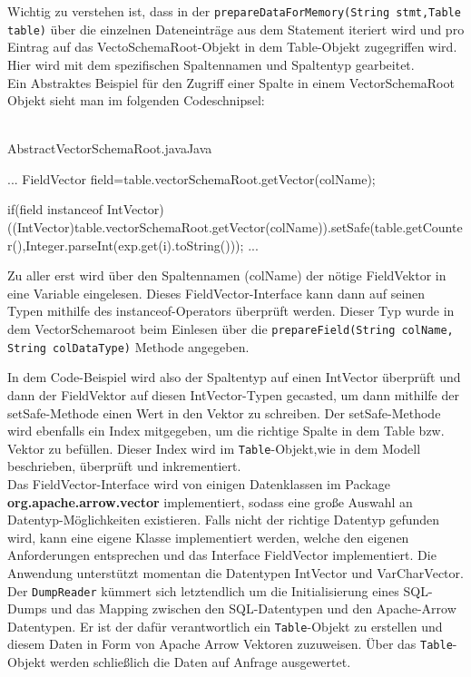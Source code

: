 Wichtig zu verstehen ist, dass in der \texttt{prepareDataForMemory(String stmt,Table table)} über die einzelnen Dateneinträge aus dem Statement iteriert wird und pro Eintrag auf das VectoSchemaRoot-Objekt in dem Table-Objekt zugegriffen wird. Hier wird mit dem spezifischen Spaltennamen und Spaltentyp gearbeitet.
\\
Ein Abstraktes Beispiel für den Zugriff einer Spalte in einem VectorSchemaRoot Objekt sieht man im folgenden Codeschnipsel:\\\\

\begin{codeblock}{AbstractVectorSchemaRoot.java}{Java}
  \begin{javacode}
    ...
    FieldVector field=table.vectorSchemaRoot.getVector(colName);

    if(field instanceof IntVector){
      ((IntVector)table.vectorSchemaRoot.getVector(colName)).setSafe(table.getCounter(),Integer.parseInt(exp.get(i).toString()));
	}    
    ...
  \end{javacode}
\end{codeblock}

Zu aller erst wird über den Spaltennamen (colName) der nötige FieldVektor in eine Variable eingelesen. Dieses FieldVector-Interface kann dann auf seinen Typen mithilfe des instanceof-Operators überprüft werden. Dieser Typ wurde in dem VectorSchemaroot beim Einlesen über die \texttt{prepareField(String colName, String colDataType)} Methode angegeben.


In dem Code-Beispiel wird also der Spaltentyp auf einen IntVector überprüft und dann der FieldVektor auf diesen IntVector-Typen gecasted, um dann mithilfe der setSafe-Methode einen Wert in den Vektor zu schreiben.
Der setSafe-Methode wird ebenfalls ein Index mitgegeben, um  die richtige Spalte in dem Table bzw. Vektor zu befüllen. Dieser Index wird im \texttt{Table}-Objekt,wie in dem Modell beschrieben, überprüft und inkrementiert.
\\
Das FieldVector-Interface wird von einigen Datenklassen im Package \textbf{org.apache.arrow.vector} implementiert, sodass eine große Auswahl an Datentyp-Möglichkeiten existieren. Falls nicht der richtige Datentyp gefunden wird, kann eine eigene Klasse implementiert werden, welche den eigenen Anforderungen entsprechen und das Interface FieldVector implementiert.
Die Anwendung unterstützt momentan die Datentypen IntVector und VarCharVector.
\\
Der \texttt{DumpReader} kümmert sich letztendlich um die Initialisierung eines SQL-Dumps und das Mapping zwischen den SQL-Datentypen und den Apache-Arrow Datentypen. Er ist der dafür verantwortlich ein \texttt{Table}-Objekt zu erstellen und diesem Daten  in Form von Apache Arrow Vektoren zuzuweisen.
Über das \texttt{Table}-Objekt werden schließlich die Daten auf Anfrage ausgewertet.





